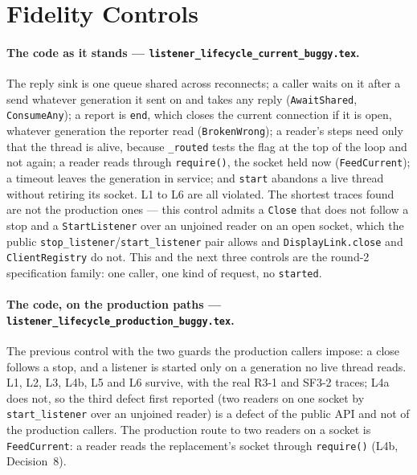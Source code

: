 \documentclass[a4paper,10pt,fleqn]{article}
\begin{document}
\section{Fidelity Controls}
\label{sec:fidelity}

\paragraph{The code as it stands ---
\texttt{listener\_lifecycle\_current\_buggy.tex}.}
The reply sink is one queue shared across reconnects; a caller waits on it
after a send whatever generation it sent on and takes any reply
(\texttt{AwaitShared}, \texttt{ConsumeAny}); a report is \texttt{end}, which
closes the current connection if it is open, whatever generation the reporter
read (\texttt{BrokenWrong}); a reader's steps need only that the thread is
alive, because \texttt{\_routed} tests the flag at the top of the loop and not
again; a reader reads through \texttt{require()}, the socket held now
(\texttt{FeedCurrent}); a timeout leaves the generation in service; and
\texttt{start} abandons a live thread without retiring its socket.  L1 to L6
are all violated.  The shortest traces found are not the production ones ---
this control admits a \texttt{Close} that does not follow a stop and a
\texttt{StartListener} over an unjoined reader on an open socket, which the
public \texttt{stop\_listener}/\texttt{start\_listener} pair allows and
\texttt{DisplayLink.close} and \texttt{ClientRegistry} do not.  This and the
next three controls are the round-2 specification family: one caller, one kind
of request, no \texttt{started}.

\paragraph{The code, on the production paths ---
\texttt{listener\_lifecycle\_production\_buggy.tex}.}
The previous control with the two guards the production callers impose: a
close follows a stop, and a listener is started only on a generation no live
thread reads.  L1, L2, L3, L4b, L5 and L6 survive, with the real R3-1 and
SF3-2 traces; L4a does not, so the third defect first reported (two readers on
one socket by \texttt{start\_listener} over an unjoined reader) is a defect of
the public API and not of the production callers.  The production route to two
readers on a socket is \texttt{FeedCurrent}: a reader reads the replacement's
socket through \texttt{require()} (L4b, Decision~8).
\end{document}
